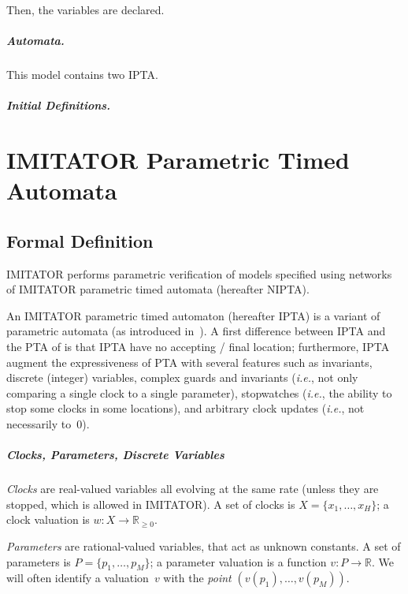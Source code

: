 \documentclass[a4paper,11pt]{report}
\newcommand{\Clock}{X} %
\newcommand{\ClockCard}{H} %
\newcommand{\clock}{x} %
\newcommand{\clockval}{w} %
\newcommand{\Param}{P} %
\newcommand{\param}{p} %
\newcommand{\ParamCard}{M} %
\newcommand{\pval}{v} %
\newcommand{\grandr}{{\mathbb R}}
\newcommand{\grandrplus}{\grandr_{\geq 0}}
\newcommand{\imitator}{\textsf{IMITATOR}}
\newcommand{\IPTA}{IPTA}
\newcommand{\NIPTA}{NIPTA}
\newcommand{\paragraphe}[1]{\paragraph{#1.}}
\newcommand{\ie}{\textcolor{colorok}{\textit{i.e.}, }}
\begin{document}
Then, the variables are declared.


\paragraphe{Automata}
This model contains two \IPTA{}.

\paragraphe{Initial Definitions}







\chapter{IMITATOR Parametric Timed Automata}\label{section:IPTA}

\section{Formal Definition}

\imitator{} performs parametric verification of models specified using networks of \imitator{} parametric timed automata (hereafter \NIPTA{}).

An \imitator{} parametric timed automaton (hereafter \IPTA{}) is a variant of parametric automata (as introduced in~\cite{AHV93}).
A first difference between \IPTA{} and the PTA of \cite{AHV93} is that \IPTA{} have no accepting / final location;
furthermore, \IPTA{} augment the expressiveness of PTA with several features such as invariants, discrete (integer) variables, complex guards and invariants (\ie{} not only comparing a single clock to a single parameter), stopwatches (\ie{} the ability to stop some clocks in some locations), and arbitrary clock updates (\ie{} not necessarily to~0).

\paragraph{Clocks, Parameters, Discrete Variables}
\emph{Clocks} are real-valued variables all evolving at the same rate (unless they are stopped, which is allowed in \imitator{}).
A set of clocks is $\Clock = \{ \clock_1, \dots, \clock_\ClockCard \}$;
a clock valuation is
$\clockval \colon \Clock \rightarrow \grandrplus$.

\emph{Parameters} are rational-valued variables, that act as unknown constants.
A set of parameters is $\Param = \{ \param_1, \dots, \param_\ParamCard \} $;
a parameter valuation is a function $\pval\colon \Param \rightarrow \grandr$.
We will often identify a valuation~$\pval$ with the \emph{point} $(\pval(\param_1), \dots, \pval(\param_{\ParamCard}))$.
\end{document}
